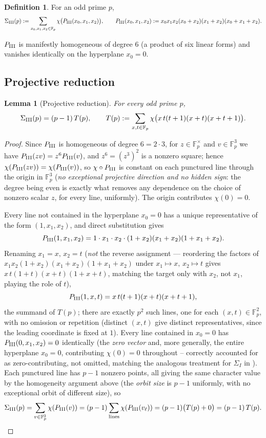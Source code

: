 \documentclass[11pt]{amsart}
\newtheorem{lemma}[theorem]{Lemma}
\theoremstyle{definition}
\newtheorem{definition}[theorem]{Definition}
\newcommand{\Fp}{\mathbb{F}_p}
\begin{document}
\begin{definition}
\label{def:sigmaIII}
For an odd prime $p$,
\[
\Sigma_{\rm III}(p) := \sum_{x_0,x_1,x_2\in\Fp}\chi\bigl(P_{\rm
III}(x_0,x_1,x_2)\bigr),\qquad P_{\rm
III}(x_0,x_1,x_2):=x_0x_1x_2(x_0+x_2)(x_1+x_2)(x_0+x_1+x_2).
\]
\end{definition}

$P_{\rm III}$ is manifestly homogeneous of degree $6$ (a product of six
linear forms) and vanishes identically on the hyperplane $x_0=0$.

\subsection{Projective reduction}

\begin{lemma}[Projective reduction]
\label{lem:sigmaIII}
For every odd prime $p$,
\[
\Sigma_{\rm III}(p) = (p-1)\,T(p),\qquad
T(p):=\sum_{x,t\in\Fp}\chi\bigl(x\,t(t+1)(x+t)(x+t+1)\bigr).
\]
\end{lemma}

\begin{proof}
Since $P_{\rm III}$ is homogeneous of degree $6=2\cdot3$, for $z\in\Fp^\times$
and $v\in\Fp^3$ we have $P_{\rm III}(zv)=z^6P_{\rm III}(v)$, and $z^6=(z^3)^2$
is a nonzero square; hence $\chi(P_{\rm III}(zv))=\chi(P_{\rm III}(v))$, so
$\chi\circ P_{\rm III}$ is constant on each punctured line through the
origin in $\Fp^3$ (\emph{no exceptional projective direction and no
hidden sign}: the degree being even is exactly what removes any
dependence on the choice of nonzero scalar $z$, for every line, uniformly).
The origin contributes $\chi(0)=0$.

Every line not contained in the hyperplane $x_0=0$ has a unique
representative of the form $(1,x_1,x_2)$, and direct substitution gives
\[
P_{\rm III}(1,x_1,x_2) = 1\cdot x_1\cdot x_2\cdot(1+x_2)(x_1+x_2)(1+x_1+x_2).
\]
Renaming $x_1=x,\,x_2=t$ (\emph{not} the reverse assignment --- reordering
the factors of $x_1x_2(1+x_2)(x_1+x_2)(1+x_1+x_2)$ under $x_1\mapsto
x,\,x_2\mapsto t$ gives $x\,t(1+t)(x+t)(1+x+t)$, matching the target only
with $x_2$, not $x_1$, playing the role of $t$),
\[
P_{\rm III}(1,x,t) = x\,t(t+1)(x+t)(x+t+1),
\]
the summand of $T(p)$; there are exactly $p^2$ such lines, one for each
$(x,t)\in\Fp^2$, with no omission or repetition (distinct $(x,t)$ give
distinct representatives, since the leading coordinate is fixed at $1$).
Every line contained in $x_0=0$ has $P_{\rm III}(0,x_1,x_2)=0$ identically
(the \emph{zero vector} and, more generally, the entire hyperplane
$x_0=0$, contributing $\chi(0)=0$ throughout -- correctly accounted for
as zero-contributing, not omitted, matching the analogous treatment for
$\Sigma_I$ in \cite{ClassesI_II}). Each punctured line has $p-1$ nonzero
points, all giving the same character value by the homogeneity argument
above (the \emph{orbit size} is $p-1$ uniformly, with no exceptional
orbit of different size), so
\[
\Sigma_{\rm III}(p) = \sum_{v\in\Fp^3}\chi(P_{\rm III}(v)) =
(p-1)\sum_{\text{lines}}\chi(P_{\rm III}(v_\ell)) = (p-1)\bigl(T(p)+0\bigr)
= (p-1)\,T(p).\qedhere
\]
\end{proof}
\end{document}
